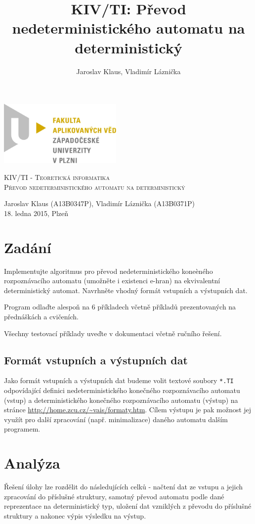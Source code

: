 \documentclass[11pt]{article}
\title{KIV/TI: Převod nedeterministického automatu na deterministický}
\author{Jaroslav Klaus, Vladimír Láznička}
\begin{document}
\begin{titlepage}
\includegraphics[width = 6cm]{logo_fav.jpg}
\begin{center}
\vfill
\textsc{\large KIV/TI - Teoretická informatika}\\
\textsc{\LARGE Převod nedeterministického automatu na deterministický}
\\[0.2cm]
\end{center}
\vfill
Jaroslav Klaus (A13B0347P), Vladimír Láznička (A13B0371P)
\\[0.2cm]
18. ledna 2015,  Plzeň
\end{titlepage}

\tableofcontents

\newpage

\section{Zadání}
Implementujte algoritmus pro převod nedeterministického koneèného rozpoznávacího automatu (umožněte i existenci e-hran) na ekvivalentní deterministický automat. Navrhněte vhodný formát vstupních a výstupních dat.

Program odlaďte alespoň na 6 příkladech včetně příkladů prezentovaných na přednáškách a cvičeních.

Všechny testovací příklady uveďte v dokumentaci včetně ručního řešení.

\subsection{Formát vstupních a výstupních dat}
Jako formát vstupních a výstupních dat budeme volit textové soubory \texttt{*.TI} odpovídající definici nedeterministického konečného rozpoznávacího automatu (vstup) a deterministického konečného rozpoznávacího automatu (výstup) na stránce \url{http://home.zcu.cz/~vais/formaty.htm}. Cílem výstupu je pak možnost jej využít pro další zpracování (např. minimalizace) daného automatu dalším programem.

\newpage

\section{Analýza}
Řešení úlohy lze rozdělit do následujících celků - načtení dat ze vstupu a jejich zpracování do příslušné struktury, samotný převod automatu podle dané reprezentace na deterministický typ, uložení dat vzniklých z převodu do příslušné struktury a nakonec výpis výsledku na výstup.
\end{document}

